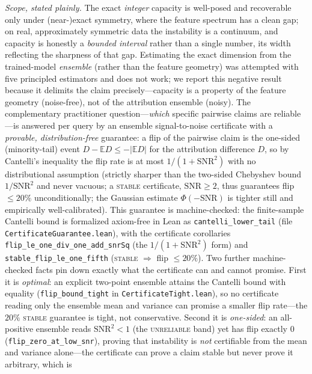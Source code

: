 \documentclass[11pt,a4paper]{article}
\begin{document}
\emph{Scope, stated plainly.}  The exact \emph{integer} capacity is well-posed and recoverable only
under (near-)exact symmetry, where the feature spectrum has a clean gap; on real, approximately
symmetric data the instability is a continuum, and capacity is honestly a \emph{bounded interval}
rather than a single number, its width reflecting the sharpness of that gap.  Estimating the exact
dimension from the trained-model \emph{ensemble} (rather than the feature geometry) was attempted
with five principled estimators and does not work; we report this negative result because it
delimits the claim precisely---capacity is a property of the feature geometry (noise-free), not of
the attribution ensemble (noisy).  The complementary practitioner question---\emph{which} specific
pairwise claims are reliable---is answered per query by an ensemble signal-to-noise certificate with
a \emph{provable, distribution-free} guarantee: a flip of the pairwise claim is the one-sided (minority-tail) event
$D - \mathbb{E}D \leq -|\mathbb{E}D|$ for the attribution difference $D$, so by Cantelli's
inequality the flip rate is at most $1/(1+\mathrm{SNR}^2)$ with no distributional assumption
(strictly sharper than the two-sided Chebyshev bound $1/\mathrm{SNR}^2$ and never vacuous; a
\textsc{stable} certificate, $\mathrm{SNR} \geq 2$, thus guarantees flip $\leq 20\%$
unconditionally; the Gaussian estimate $\Phi(-\mathrm{SNR})$ is tighter still and empirically
well-calibrated).  This guarantee is machine-checked: the finite-sample Cantelli bound is formalized
axiom-free in Lean as \texttt{cantelli\_lower\_tail} (file \texttt{CertificateGuarantee.lean}), with
the certificate corollaries \texttt{flip\_le\_one\_div\_one\_add\_snrSq} (the $1/(1+\mathrm{SNR}^2)$
form) and \texttt{stable\_flip\_le\_one\_fifth} (\textsc{stable} $\Rightarrow$ flip $\leq 20\%$).  Two
further machine-checked facts pin down exactly what the certificate can and cannot promise.  First it
is \emph{optimal}: an explicit two-point ensemble attains the Cantelli bound with equality
(\texttt{flip\_bound\_tight} in \texttt{CertificateTight.lean}), so no certificate reading only the
ensemble mean and variance can promise a smaller flip rate---the $20\%$ \textsc{stable} guarantee is
tight, not conservative.  Second it is \emph{one-sided}: an all-positive ensemble reads
$\mathrm{SNR}^2 < 1$ (the \textsc{unreliable} band) yet has flip exactly $0$
(\texttt{flip\_zero\_at\_low\_snr}), proving that instability is \emph{not} certifiable from the mean
and variance alone---the certificate can prove a claim stable but never prove it arbitrary, which is
\end{document}
